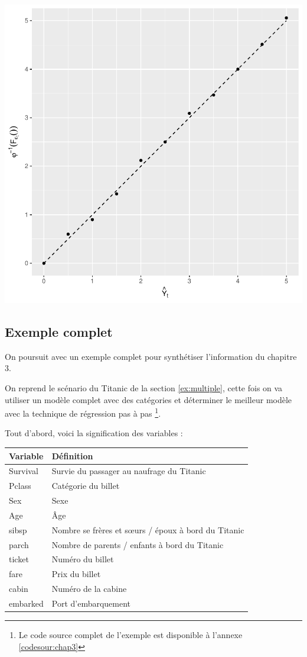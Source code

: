 \documentclass[11pt,french]{report}
\begin{document}
\includegraphics{notes_de_cours-035}

\subsection{Exemple complet}
\label{ex:chapitre3}

On poursuit avec un exemple complet pour synthétiser l'information du chapitre 3. \newline

On reprend le scénario du Titanic de la section \ref{ex:multiple}, cette fois on va utiliser un modèle complet avec des catégories et déterminer le meilleur modèle avec la technique de régression pas à pas \footnote{Le code source complet de l'exemple est disponible à l'annexe \ref{codesour:chap3}}.  \newline

Tout d'abord, voici la signification des variables :
\begin{center}
\begin{tabularx}{\textwidth}{XX}
\hline
Variable & Définition \\
\hline
Survival & Survie du passager au naufrage du Titanic \\
Pclass & Catégorie du billet \\
Sex & Sexe \\
Age & Âge \\
sibsp & Nombre se frères et sœurs / époux à bord du Titanic \\
parch & Nombre de parents / enfants à bord du Titanic \\
ticket & Numéro du billet \\
fare & Prix du billet \\
cabin & Numéro de la cabine \\
embarked & Port d'embarquement \\
\hline
\end{tabularx}
\end{center}
\end{document}
